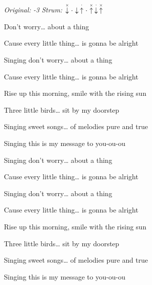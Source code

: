 \begin{song}


\begin{headerbox}
\RaiseBoxWithChucks
\textit{Original: -3} \quad
\textit{Strum:} $\ChuckDown\Miss\Down\StaccatoUp\Miss\ChuckUp\StaccatoDown\ChuckUp$
\end{headerbox}

\begin{hchordbox}
\end{hchordbox}

\Large

\bigskip

Don't worry… about a thing \par
Cause every little thing… is gonna be alright \par
Singing don't worry… about a thing \par
Cause every little thing… is gonna be alright \par

\bigskip

Rise up this morning, smile with the rising sun \par
Three little birds… sit by my doorstep \par
Singing sweet songs… of melodies pure and true \par
Singing  this is my message to you-ou-ou \par

\bigskip

Singing don't worry… about a thing \par
Cause every little thing… is gonna be alright \par
Singing don't worry… about a thing \par
Cause every little thing… is gonna be alright \par

\bigskip

Rise up this morning, smile with the rising sun \par
Three little birds… sit by my doorstep \par
Singing sweet songs… of melodies pure and true \par
Singing  this is my message to you-ou-ou \par


\end{song}
